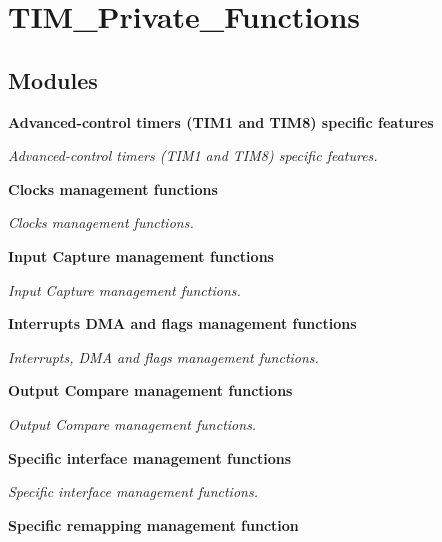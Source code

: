 \section{T\+I\+M\+\_\+\+Private\+\_\+\+Functions}
\label{group__TIM__Private__Functions}
\subsection*{Modules}
\begin{DoxyCompactItemize}
\item 
\textbf{ Advanced-\/control timers (\+T\+I\+M1 and T\+I\+M8) specific features}
\begin{DoxyCompactList}\small\item\em Advanced-\/control timers (T\+I\+M1 and T\+I\+M8) specific features. \end{DoxyCompactList}\item 
\textbf{ Clocks management functions}
\begin{DoxyCompactList}\small\item\em Clocks management functions. \end{DoxyCompactList}\item 
\textbf{ Input Capture management functions}
\begin{DoxyCompactList}\small\item\em Input Capture management functions. \end{DoxyCompactList}\item 
\textbf{ Interrupts D\+M\+A and flags management functions}
\begin{DoxyCompactList}\small\item\em Interrupts, D\+MA and flags management functions. \end{DoxyCompactList}\item 
\textbf{ Output Compare management functions}
\begin{DoxyCompactList}\small\item\em Output Compare management functions. \end{DoxyCompactList}\item 
\textbf{ Specific interface management functions}
\begin{DoxyCompactList}\small\item\em Specific interface management functions. \end{DoxyCompactList}\item 
\textbf{ Specific remapping management function}

\end{DoxyCompactItemize}
